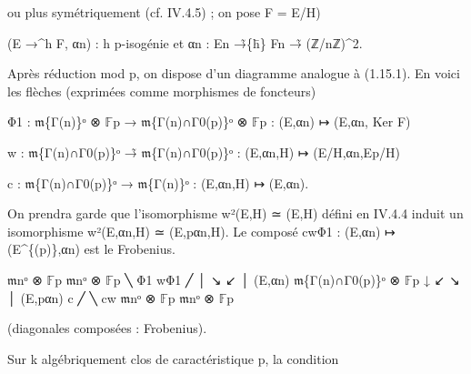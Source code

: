 \documentclass[11pt,a4paper]{article}
\begin{document}
ou plus symétriquement (cf. IV.4.5) ; on pose F = E/H)

(E →\textasciicircum{}h F, α\textunderscore{}n) : h p-isogénie et α\textunderscore{}n : E\textunderscore{}n →̃\textunderscore{}\{h̄\} F\textunderscore{}n →̃ (ℤ/nℤ)\textasciicircum{}2.

Après réduction mod p, on dispose d'un diagramme analogue à (1.15.1). En voici les flèches (exprimées comme morphismes de foncteurs)

Φ\textunderscore{}1 : \ensuremath{\mathfrak{m}}\textunderscore{}\{Γ(n)\}ᵒ ⊗ \ensuremath{\mathbb{F}}\textunderscore{}p → \ensuremath{\mathfrak{m}}\textunderscore{}\{Γ(n)∩Γ\textunderscore{}0(p)\}ᵒ ⊗ \ensuremath{\mathbb{F}}\textunderscore{}p : (E,α\textunderscore{}n) ↦ (E,α\textunderscore{}n, Ker F)

w : \ensuremath{\mathfrak{m}}\textunderscore{}\{Γ(n)∩Γ\textunderscore{}0(p)\}ᵒ →̃ \ensuremath{\mathfrak{m}}\textunderscore{}\{Γ(n)∩Γ\textunderscore{}0(p)\}ᵒ : (E,α\textunderscore{}n,H) ↦ (E/H,α\textunderscore{}n,E\textunderscore{}p/H)

c : \ensuremath{\mathfrak{m}}\textunderscore{}\{Γ(n)∩Γ\textunderscore{}0(p)\}ᵒ → \ensuremath{\mathfrak{m}}\textunderscore{}\{Γ(n)\}ᵒ : (E,α\textunderscore{}n,H) ↦ (E,α\textunderscore{}n).

On prendra garde que l'isomorphisme w²(E,H) ≃ (E,H) défini en IV.4.4 induit un isomorphisme w²(E,α\textunderscore{}n,H) ≃ (E,pα\textunderscore{}n,H). Le composé cwΦ\textunderscore{}1 : (E,α\textunderscore{}n) ↦ (E\textasciicircum{}\{(p)\},α\textunderscore{}n) est le Frobenius.

\ensuremath{\mathfrak{m}}\textunderscore{}nᵒ ⊗ \ensuremath{\mathbb{F}}\textunderscore{}p                         \ensuremath{\mathfrak{m}}\textunderscore{}nᵒ ⊗ \ensuremath{\mathbb{F}}\textunderscore{}p ╲ Φ\textunderscore{}1                   wΦ\textunderscore{}1 ╱ │ ↘                         ↙    │ (E,α\textunderscore{}n) \ensuremath{\mathfrak{m}}\textunderscore{}\{Γ(n)∩Γ\textunderscore{}0(p)\}ᵒ ⊗ \ensuremath{\mathbb{F}}\textunderscore{}p            ↓ ↙                         ↘    │ (E,pα\textunderscore{}n) c ╱                           ╲ cw \ensuremath{\mathfrak{m}}\textunderscore{}nᵒ ⊗ \ensuremath{\mathbb{F}}\textunderscore{}p                         \ensuremath{\mathfrak{m}}\textunderscore{}nᵒ ⊗ \ensuremath{\mathbb{F}}\textunderscore{}p

(diagonales composées : Frobenius).

Sur k algébriquement clos de caractéristique p, la condition
\end{document}
